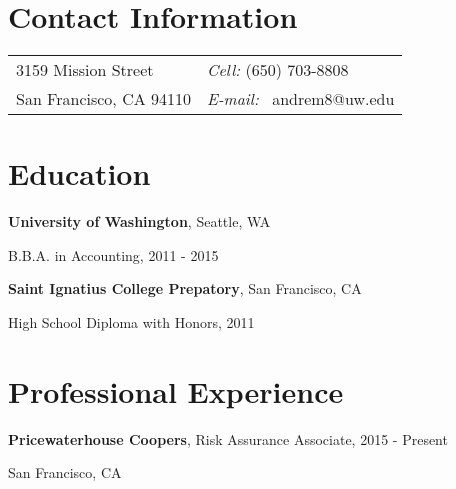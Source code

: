 \documentclass[margin,line]{res}
\begin{document}

\begin{resume}
\section{\sc Contact Information}
\vspace{.05in}
\begin{tabular}{@{}p{2in}p{4in}}
3159 Mission Street  & {\it Cell:}  (650) 703-8808 \\  
San Francisco, CA 94110 & {\it E-mail:}  {\ andrem8@uw.edu} \\              
\end{tabular}

\section{\sc Education}
{\bf University of Washington}, Seattle, WA

\vspace*{-4mm}
B.B.A. in Accounting, 2011 - 2015 

{\bf Saint Ignatius College Prepatory}, San Francisco, CA

\vspace*{-4mm}
High School Diploma with Honors, 2011 

\section{\sc Professional Experience}

{\bf Pricewaterhouse Coopers}, Risk Assurance Associate, 2015 - Present

\vspace*{-4mm}San Francisco, CA

\renewcommand\labelitemi{\tiny$\bullet$}


\end{resume}
\end{document}
